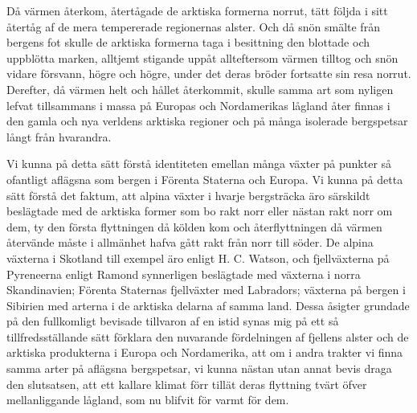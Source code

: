 Då värmen återkom, återtågade de arktiska formerna norrut, tätt följda i sitt återtåg af de mera tempererade regionernas alster. Och då snön smälte från bergens fot skulle de arktiska formerna taga i besittning den blottade och uppblötta marken, alltjemt stigande uppåt allteftersom värmen tilltog och snön vidare försvann, högre och högre, under det deras bröder fortsatte sin resa norrut. Derefter, då värmen helt och hållet återkommit, skulle samma art som nyligen lefvat tillsammans i massa på Europas och Nordamerikas lågland åter finnas i den gamla och nya verldens arktiska regioner och på många isolerade bergspetsar långt från hvarandra.

Vi kunna på detta sätt förstå identiteten emellan många växter på punkter så ofantligt aflägsna som bergen i Förenta Staterna och Europa. Vi kunna på detta sätt förstå det faktum, att alpina växter i hvarje bergsträcka äro särskildt beslägtade med de arktiska former som bo rakt norr eller nästan rakt norr om dem, ty den första flyttningen då kölden kom och återflyttningen då värmen återvände måste i allmänhet hafva gått rakt från norr till söder. De alpina växterna i Skotland till exempel äro enligt H. C. Watson, och fjellväxterna på Pyreneerna enligt Ramond synnerligen beslägtade med växterna i norra Skandinavien; Förenta Staternas fjellväxter med Labradors; växterna på bergen i Sibirien med arterna i de arktiska delarna af samma land. Dessa åsigter grundade på den fullkomligt bevisade tillvaron af en istid synas mig på ett så tillfredsställande sätt förklara den nuvarande fördelningen af fjellens alster och de arktiska produkterna i Europa och Nordamerika, att om i andra trakter vi finna samma arter på aflägsna bergspetsar, vi kunna nästan utan annat bevis draga den slutsatsen, att ett kallare klimat förr tillät deras flyttning tvärt öfver mellanliggande lågland, som nu blifvit för varmt för dem.


